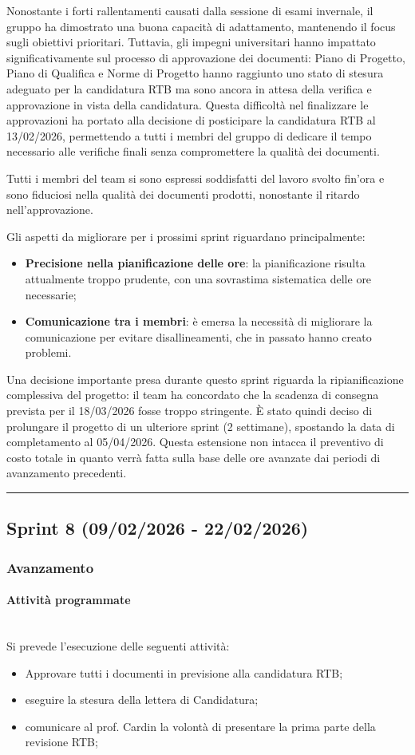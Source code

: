 \documentclass[10pt, letterpaper]{article}
\newcommand{\trisubsection}[1]{\paragraph{#1}\mbox{}\\}
\begin{document}
Nonostante i forti rallentamenti causati dalla sessione di esami invernale, il gruppo ha dimostrato una buona capacità di adattamento, mantenendo il focus sugli
obiettivi prioritari. Tuttavia, gli impegni universitari hanno impattato significativamente sul processo di approvazione dei documenti: Piano di Progetto, Piano di
Qualifica e Norme di Progetto hanno raggiunto uno stato di stesura adeguato per la candidatura RTB ma sono ancora in attesa della verifica e approvazione in vista
della candidatura. Questa difficoltà nel finalizzare le approvazioni ha portato alla decisione di posticipare la candidatura RTB al 13/02/2026, permettendo a tutti
i membri del gruppo di dedicare il tempo necessario alle verifiche finali senza compromettere la qualità dei documenti.

Tutti i membri del team si sono espressi soddisfatti del lavoro svolto fin'ora e sono fiduciosi nella qualità dei documenti prodotti, nonostante il ritardo nell'approvazione.

Gli aspetti da migliorare per i prossimi sprint riguardano principalmente:
\begin{itemize}
    \item \textbf{Precisione nella pianificazione delle ore}: la pianificazione risulta attualmente troppo prudente, con una sovrastima sistematica delle ore necessarie;
    \item \textbf{Comunicazione tra i membri}: è emersa la necessità di migliorare la comunicazione per evitare disallineamenti, che in passato hanno creato problemi.
\end{itemize}

Una decisione importante presa durante questo sprint riguarda la ripianificazione complessiva del progetto: il team ha concordato che la scadenza di consegna prevista per il 18/03/2026 fosse troppo stringente. È stato quindi deciso di prolungare il progetto di un ulteriore sprint (2 settimane), spostando la data di completamento al 05/04/2026. Questa estensione non intacca il preventivo di costo totale in quanto verrà fatta sulla base delle ore avanzate dai periodi di avanzamento precedenti.

\vspace{1em}
\hrule
\vspace{1em}

\subsection{Sprint 8 (09/02/2026 - 22/02/2026)}
\subsubsection{Avanzamento}
\trisubsection{Attività programmate}
Si prevede l'esecuzione delle seguenti attività:
\begin{itemize}
    \item Approvare tutti i documenti in previsione alla candidatura RTB;
    \item eseguire la stesura della lettera di Candidatura;
    \item comunicare al prof. Cardin la volontà di presentare la prima parte della revisione RTB;
\end{itemize}
\end{document}
